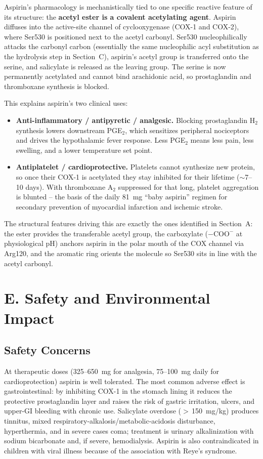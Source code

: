 \documentclass[9pt]{extarticle}
\begin{document}
Aspirin's pharmacology is mechanistically tied to one specific reactive
feature of its structure: the \textbf{acetyl ester is a covalent
acetylating agent}. Aspirin diffuses into the active-site channel of
cyclooxygenase (COX-1 and COX-2), where Ser530 is positioned next to
the acetyl carbonyl. Ser530 nucleophilically attacks the carbonyl
carbon (essentially the same nucleophilic acyl substitution as the
hydrolysis step in Section~C), aspirin's acetyl group is transferred
onto the serine, and salicylate is released as the leaving group. The
serine is now permanently acetylated and cannot bind arachidonic acid,
so prostaglandin and thromboxane synthesis is blocked.

This explains aspirin's two clinical uses:
\begin{itemize}
  \item \textbf{Anti-inflammatory / antipyretic / analgesic.} Blocking
        prostaglandin H$_2$ synthesis lowers downstream PGE$_2$, which
        sensitizes peripheral nociceptors and drives the hypothalamic
        fever response. Less PGE$_2$ means less pain, less swelling,
        and a lower temperature set point.
  \item \textbf{Antiplatelet / cardioprotective.} Platelets cannot
        synthesize new protein, so once their COX-1 is acetylated they
        stay inhibited for their lifetime ($\sim$7--10 days). With
        thromboxane A$_2$ suppressed for that long, platelet
        aggregation is blunted -- the basis of the daily 81~mg ``baby
        aspirin'' regimen for secondary prevention of myocardial
        infarction and ischemic stroke.
\end{itemize}

The structural features driving this are exactly the ones identified
in Section~A: the ester provides the transferable acetyl group, the
carboxylate ($-\mathrm{COO^-}$ at physiological pH) anchors aspirin in
the polar mouth of the COX channel via Arg120, and the aromatic ring
orients the molecule so Ser530 sits in line with the acetyl carbonyl.

\section*{E. Safety and Environmental Impact}

\subsection*{Safety Concerns}
At therapeutic doses (325--650~mg for analgesia,
75--100~mg daily for cardioprotection) aspirin is well tolerated. The
most common adverse effect is gastrointestinal: by inhibiting COX-1 in
the stomach lining it reduces the protective prostaglandin layer and
raises the risk of gastric irritation, ulcers, and upper-GI bleeding
with chronic use. Salicylate overdose ($>$\,150~mg/kg) produces
tinnitus, mixed respiratory-alkalosis/metabolic-acidosis disturbance,
hyperthermia, and in severe cases coma; treatment is urinary
alkalinization with sodium bicarbonate and, if severe, hemodialysis.
Aspirin is also contraindicated in children with viral illness because
of the association with Reye's syndrome.
\end{document}

